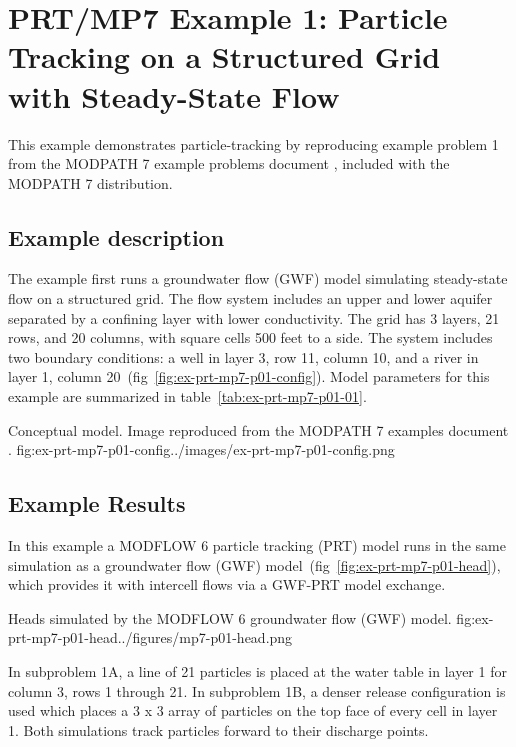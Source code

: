 \section{PRT/MP7 Example 1: Particle Tracking on a Structured Grid with Steady-State Flow}

This example demonstrates particle-tracking by reproducing example problem 1 from the MODPATH 7 example problems document \citep{modpath7examples}, included with the MODPATH 7 distribution\citep{modpath7}.

\subsection{Example description}

The example first runs a groundwater flow (GWF) model simulating steady-state flow on a structured grid. The flow system includes an upper and lower aquifer separated by a confining layer with lower conductivity. The grid has 3 layers, 21 rows, and 20 columns, with square cells 500 feet to a side. The system includes two boundary conditions: a well in layer 3, row 11, column 10, and a river in layer 1, column 20~(fig~\ref{fig:ex-prt-mp7-p01-config}). Model parameters for this example are summarized in table~\ref{tab:ex-prt-mp7-p01-01}.

\begin{StandardFigure}{
    Conceptual model. Image reproduced from the MODPATH 7 examples document \citep{modpath7examples}.
    }{fig:ex-prt-mp7-p01-config}{../images/ex-prt-mp7-p01-config.png}
\end{StandardFigure}



\subsection{Example Results}

In this example a MODFLOW 6 particle tracking (PRT) model runs in the same simulation as a groundwater flow (GWF) model~(fig~\ref{fig:ex-prt-mp7-p01-head}), which provides it with intercell flows via a GWF-PRT model exchange.

\begin{StandardFigure}{
    Heads simulated by the MODFLOW 6 groundwater flow (GWF) model.
    }{fig:ex-prt-mp7-p01-head}{../figures/mp7-p01-head.png}
\end{StandardFigure}

In subproblem 1A, a line of 21 particles is placed at the water table in layer 1 for column 3, rows 1 through 21. In subproblem 1B, a denser release configuration is used which places a 3 x 3 array of particles on the top face of every cell in layer 1. Both simulations track particles forward to their discharge points.

